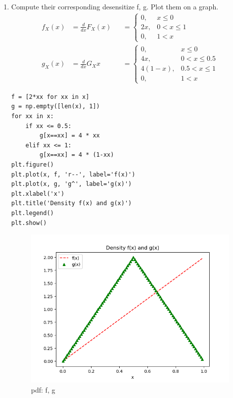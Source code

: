 \documentclass[preprint,12pt]{elsarticle}
\begin{document}
\begin{enumerate}
    \item Compute their corresponding desensitize f, g. Plot them on a 
    graph.
    \begin{align*}
        f_X(x) &= \frac{d}{dx}F_X(x)    &&=
        \begin{cases}
            0,  &x\leq 0\\
            2x, &0<x\leq 1\\
            0,  &1<x
        \end{cases} \\
        g_X(x)  &= \frac{d}{dx}G_X{x}   &&=
        \begin{cases}
            0,          &x\leq 0\\
            4x,         &0<x\leq 0.5\\
            4(1-x),     &0.5<x\leq 1\\
            0,          &1<x
        \end{cases}
    \end{align*}
    \begin{lstlisting}
f = [2*xx for xx in x]
g = np.empty([len(x), 1])
for xx in x:
    if xx <= 0.5:
        g[x==xx] = 4 * xx
    elif xx <= 1:
        g[x==xx] = 4 * (1-xx)
plt.figure()
plt.plot(x, f, 'r--', label='f(x)')
plt.plot(x, g, 'g^', label='g(x)')
plt.xlabel('x')
plt.title('Density f(x) and g(x)')
plt.legend()
plt.show()    
    \end{lstlisting}
    \begin{figure}[htbp!]
        \center
        \includegraphics[width = \textwidth]{2.png}
        \caption{pdf: f, g}
        \label{fig:2}
    \end{figure}


\end{enumerate}
\end{document}
